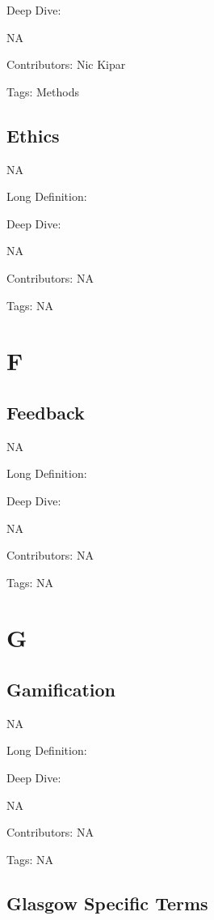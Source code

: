 \documentclass[
  letterpaper,
  DIV=11,
  numbers=noendperiod]{scrreprt}
\begin{document}
Deep Dive:

NA

Contributors: Nic Kipar

Tags: Methods

\section{Ethics}\label{ethics}

NA

Long Definition:

Deep Dive:

NA

Contributors: NA

Tags: NA


\chapter{F}\label{f}

\section{Feedback}\label{feedback}

NA

Long Definition:

Deep Dive:

NA

Contributors: NA

Tags: NA


\chapter{G}\label{g}

\section{Gamification}\label{gamification}

NA

Long Definition:

Deep Dive:

NA

Contributors: NA

Tags: NA

\section{Glasgow Specific Terms}\label{glasgow-specific-terms}
\end{document}
